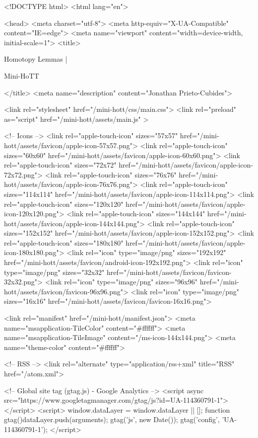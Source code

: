 <!DOCTYPE html>
<html lang="en">

<head>
  <meta charset="utf-8">
  <meta http-equiv="X-UA-Compatible" content="IE=edge">
  <meta name="viewport" content="width=device-width, initial-scale=1">
  <title>
    
      
        Homotopy Lemmas |
      
        Mini-HoTT
    
  </title>
  <meta name="description" content="Jonathan Prieto-Cubides">

  <link rel="stylesheet" href="/mini-hott/css/main.css">
  <link rel="preload" as="script" href="/mini-hott/assets/main.js" >

  <!-- Icons -->
  <link rel="apple-touch-icon" sizes="57x57" href="/mini-hott/assets/favicon/apple-icon-57x57.png">
  <link rel="apple-touch-icon" sizes="60x60" href="/mini-hott/assets/favicon/apple-icon-60x60.png">
  <link rel="apple-touch-icon" sizes="72x72" href="/mini-hott/assets/favicon/apple-icon-72x72.png">
  <link rel="apple-touch-icon" sizes="76x76" href="/mini-hott/assets/favicon/apple-icon-76x76.png">
  <link rel="apple-touch-icon" sizes="114x114" href="/mini-hott/assets/favicon/apple-icon-114x114.png">
  <link rel="apple-touch-icon" sizes="120x120" href="/mini-hott/assets/favicon/apple-icon-120x120.png">
  <link rel="apple-touch-icon" sizes="144x144" href="/mini-hott/assets/favicon/apple-icon-144x144.png">
  <link rel="apple-touch-icon" sizes="152x152" href="/mini-hott/assets/favicon/apple-icon-152x152.png">
  <link rel="apple-touch-icon" sizes="180x180" href="/mini-hott/assets/favicon/apple-icon-180x180.png">
  <link rel="icon" type="image/png" sizes="192x192"  href="/mini-hott/assets/favicon/android-icon-192x192.png">
  <link rel="icon" type="image/png" sizes="32x32" href="/mini-hott/assets/favicon/favicon-32x32.png">
  <link rel="icon" type="image/png" sizes="96x96" href="/mini-hott/assets/favicon/favicon-96x96.png">
  <link rel="icon" type="image/png" sizes="16x16" href="/mini-hott/assets/favicon/favicon-16x16.png">

  <link rel="manifest" href="/mini-hott/manifest.json">
  <meta name="msapplication-TileColor" content="#ffffff">
  <meta name="msapplication-TileImage" content="/ms-icon-144x144.png">
  <meta name="theme-color" content="#ffffff">

  <!-- RSS -->
  <link rel="alternate" type="application/rss+xml" title="RSS" href="/atom.xml">

  <!-- Global site tag (gtag.js) - Google Analytics -->
  <script async src="https://www.googletagmanager.com/gtag/js?id=UA-114360791-1"></script>
  <script>
    window.dataLayer = window.dataLayer || [];
    function gtag(){dataLayer.push(arguments);}
    gtag('js', new Date());
    gtag('config', 'UA-114360791-1');
  </script>

